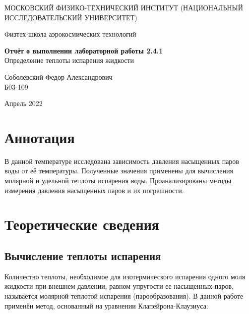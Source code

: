 \documentclass[a4paper,12pt]{article} %
\date{\today}
\begin{document}
\begin{titlepage}
	\begin{center}
		{\large МОСКОВСКИЙ ФИЗИКО-ТЕХНИЧЕСКИЙ ИНСТИТУТ (НАЦИОНАЛЬНЫЙ ИССЛЕДОВАТЕЛЬСКИЙ УНИВЕРСИТЕТ)}
	\end{center}
	\begin{center}
		{\large Физтех-школа аэрокосмических технологий}
	\end{center}
	
	
	\vspace{4.5cm}
	{\huge
		\begin{center}
			{\bf Отчёт о выполнении лабораторной работы 2.4.1}\\
			Определение теплоты испарения жидкости
		\end{center}
	}
	\vspace{1cm}
	\begin{center}
		{\large Соболевский Федор Александрович \\
			\vspace{0.2cm}
			Б03-109}
	\end{center}
	\vspace{8cm}
	\begin{center}
		Апрель 2022
	\end{center}
\end{titlepage}

\section{Аннотация}

В данной температуре исследована зависимость давления насыщенных паров воды от её температуры. Полученные значения применены для вычисления молярной и удельной теплоты испарения воды. Проанализированы методы измерения давления насыщенных паров и их погрешности.

\section{Теоретические сведения}

\subsection{Вычисление теплоты испарения}

Количество теплоты, необходимое для изотермического испарения одного моля жидкости при внешнем давлении, равном упругости ее насыщенных паров, называется молярной теплотой испарения (парообразования). В данной работе применён метод, основанный на уравнении Клапейрона-Клаузиуса:
\end{document}

